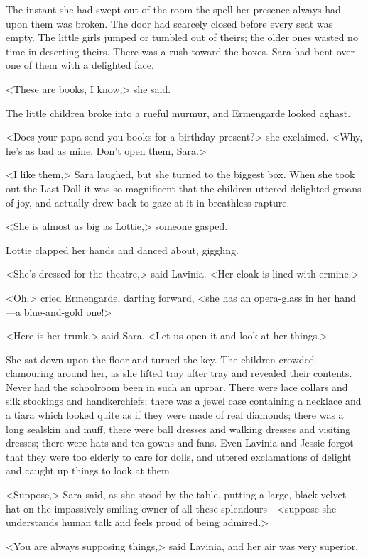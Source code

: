 The instant she had swept out of the room the spell her presence always had upon them was broken. The door had scarcely closed before every seat was empty. The little girls jumped or tumbled out of theirs; the older ones wasted no time in deserting theirs. There was a rush toward the boxes. Sara had bent over one of them with a delighted face.

<These are books, I know,> she said.

The little children broke into a rueful murmur, and Ermengarde looked aghast.

<Does your papa send you books for a birthday present?> she exclaimed. <Why, he's as bad as mine. Don't open them, Sara.>

<I like them,> Sara laughed, but she turned to the biggest box. When she took out the Last Doll it was so magnificent that the children uttered delighted groans of joy, and actually drew back to gaze at it in breathless rapture.

<She is almost as big as Lottie,> someone gasped.

Lottie clapped her hands and danced about, giggling.

<She's dressed for the theatre,> said Lavinia. <Her cloak is lined with ermine.>

<Oh,> cried Ermengarde, darting forward, <she has an opera-glass in her hand—a blue-and-gold one!>

<Here is her trunk,> said Sara. <Let us open it and look at her things.>

She sat down upon the floor and turned the key. The children crowded clamouring around her, as she lifted tray after tray and revealed their contents. Never had the schoolroom been in such an uproar. There were lace collars and silk stockings and handkerchiefs; there was a jewel case containing a necklace and a tiara which looked quite as if they were made of real diamonds; there was a long sealskin and muff, there were ball dresses and walking dresses and visiting dresses; there were hats and tea gowns and fans. Even Lavinia and Jessie forgot that they were too elderly to care for dolls, and uttered exclamations of delight and caught up things to look at them.

<Suppose,> Sara said, as she stood by the table, putting a large, black-velvet hat on the impassively smiling owner of all these splendours—<suppose she understands human talk and feels proud of being admired.>

<You are always supposing things,> said Lavinia, and her air was very superior.

